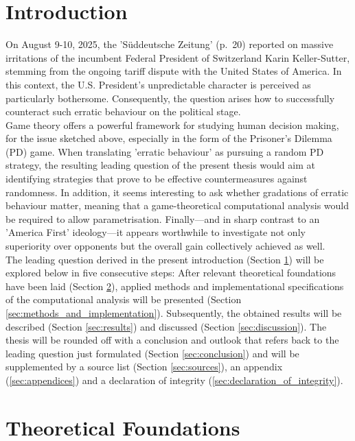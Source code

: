 \documentclass[11pt]{article}
\begin{document}
\section{Introduction} \label{sec:intro}
On August 9-10, 2025, the 'Süddeutsche Zeitung' (p.~20) reported on massive irritations of the incumbent Federal President of Switzerland Karin Keller-Sutter, stemming from the ongoing tariff dispute with the United States of America.
In this context, the U.S. President's unpredictable character is perceived as particularly bothersome.
Consequently, the question arises how to successfully counteract such erratic behaviour on the political stage.\\
\indent Game theory offers a powerful framework for studying human decision making, for the issue sketched above, especially in the form of the Prisoner's Dilemma (PD) game.
When translating 'erratic behaviour' as pursuing a random PD strategy, the resulting leading question of the present thesis would aim at identifying strategies that prove to be effective countermeasures against randomness.
In addition, it seems interesting to ask whether gradations of erratic behaviour matter, meaning that a game-theoretical computational analysis would be required to allow parametrisation.
Finally---and in sharp contrast to an 'America First' ideology---it appears worthwhile to investigate not only superiority over opponents but the overall gain collectively achieved as well.\\
\indent The leading question derived in the present introduction (Section \ref{sec:intro}) will be explored below in five consecutive steps: After relevant theoretical foundations have been laid (Section \ref{sec:theoretical_found}), applied methods and implementational specifications of the computational analysis will be presented (Section \ref{sec:methods_and_implementation}).
Subsequently, the obtained results will be described (Section \ref{sec:results}) and discussed (Section \ref{sec:discussion}). 
The thesis will be rounded off with a conclusion and outlook that refers back to the leading question just formulated (Section \ref{sec:conclusion}) and will be supplemented by a source list (Section \ref{sec:sources}), an appendix (\ref{sec:appendices}) and a declaration of integrity (\ref{sec:declaration_of_integrity}).

\section{Theoretical Foundations} \label{sec:theoretical_found}
\end{document}

